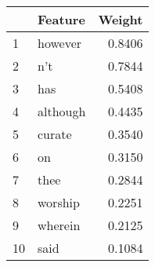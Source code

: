 \begin{tabular}{llr}
\toprule
{} &   Feature &  Weight \\
\midrule
1  &   however &  0.8406 \\
2  &       n't &  0.7844 \\
3  &       has &  0.5408 \\
4  &  although &  0.4435 \\
5  &    curate &  0.3540 \\
6  &        on &  0.3150 \\
7  &      thee &  0.2844 \\
8  &   worship &  0.2251 \\
9  &   wherein &  0.2125 \\
10 &      said &  0.1084 \\
\bottomrule
\end{tabular}
